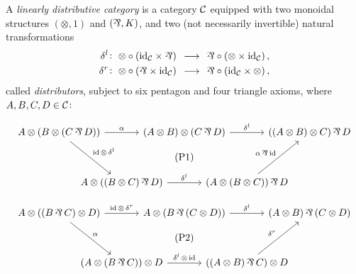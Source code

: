 \documentclass[reqno,12pt]{amsart}
\begin{document}
\begin{definition}\label{def:LD-cat}
	A \emph{linearly distributive category} is a category $\mathcal C$ equipped with two monoidal structures $(\otimes,1)$ and $(\partimes,K)$, and two (not necessarily invertible) natural transformations 
	\begin{align}\label{eq: distributorl}
		\distl\colon\; {\otimes} \circ (\idC \tim {\partimes}) &\;\slongrightarrow\; {\partimes} \circ ({\otimes} \tim \idC)\,,\\
		\distr\colon\; {\otimes} \circ ({\partimes} \tim \idC) &\;\slongrightarrow\; {\partimes} \circ ({\idC} \tim {\otimes})\,,
	\end{align}
	called \emph{distributors}, subject to six pentagon and four triangle axioms, where $A,B,C,D\in \mathcal C$:
	
	\begingroup
	\renewcommand{\theequation}{\textup{P1}}
	\label{eq:P1}
	\begin{equation*}
		\begin{tikzcd}[column sep=-1cm, row sep=0.28cm]
			A\ot (B\ot (C\partimes D)) && (A\ot B)\ot (C\prt D) && ((A\ot B)\ot C)\prt D \\
			&& \text{(P1)} && \\
			& A\ot ((B\ot C)\prt D) && (A\ot (B\ot C))\prt D &
			\arrow["\ao", from=1-1, to=1-3]
			\arrow["\distl", from=1-3, to=1-5]
			\arrow["\id\,\ot\,\distl", from=1-1, to=3-2]
			\arrow["\distl", from=3-2, to=3-4]
			\arrow["\ao\prt\id", from=3-4, to=1-5]
		\end{tikzcd}
	\end{equation*}
	\endgroup
	
	\begingroup
	\renewcommand{\theequation}{\textup{P2}}
	\label{eq:P2}
	\begin{equation*}
		\begin{tikzcd}[column sep=-1cm, row sep=0.28cm]
			A\ot ((B\prt C)\ot D) && A\ot (B\prt {(C\ot D)}) && (A\ot B)\prt {(C\ot D)}\\
			&& \text{(P2)} && \\
			& (A\ot (B\prt C))\ot D && ((A\ot B)\prt C)\ot D &
			\arrow["\id\,\ot\,\distr", from=1-1, to=1-3]
			\arrow["\distl", from=1-3, to=1-5]
			\arrow["\ao", from=1-1, to=3-2]
			\arrow["\distl\,\ot\,\id", from=3-2, to=3-4]
			\arrow["\distr", from=3-4, to=1-5]
		\end{tikzcd}
	\end{equation*}
	\endgroup
	

\end{definition}
\end{document}
